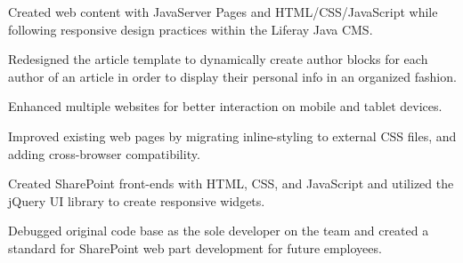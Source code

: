 \documentclass[]{deedy-resume-openfont}
\begin{document}
\vspace{1mm}

\vspace{1mm}
\begin{tightemize} \itemsep 7pt
\item Created web content with JavaServer Pages and HTML/CSS/JavaScript while
following responsive design practices within the Liferay Java CMS.
\item Redesigned the article template to dynamically create author blocks for each
author of an article in order to display their personal info in an organized fashion.
\item Enhanced multiple websites for better interaction on mobile and tablet devices.
\end{tightemize}
\sectionsep

\vspace{1mm}

\vspace{1mm}
\begin{tightemize} \itemsep 7pt
\item Improved existing web pages by migrating inline-styling to external CSS files,
and adding cross-browser compatibility.
\item Created SharePoint front-ends with HTML, CSS, and JavaScript and utilized the jQuery UI library to create responsive widgets.
\item Debugged original code base as the sole developer on the team and created a standard for SharePoint web part development for future employees.
\end{tightemize}

\vspace{1mm}
\end{document}
